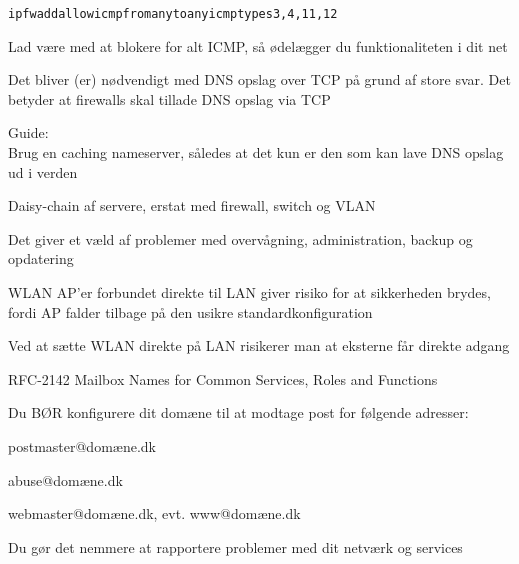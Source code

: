 \documentclass[Screen16to9,17pt]{foils}
\begin{document}

\begin{alltt}
ipfw add allow icmp from any to any icmptypes 3,4,11,12
\end{alltt}

\begin{list1}
\item Lad være med at blokere for alt ICMP, så ødelægger du funktionaliteten i dit net
\vskip 1cm
\item \end{list1}


\begin{list1}
\item Det bliver (er) nødvendigt med DNS opslag over TCP på grund af store svar. Det betyder at firewalls skal tillade DNS opslag via TCP
\vskip 1cm
\item
\item Guide:\\
Brug en caching nameserver, således at det kun er den som kan lave DNS opslag ud i verden

\end{list1}



\begin{list1}
\item Daisy-chain af servere, erstat med firewall, switch og VLAN
\item Det giver et væld af problemer med overvågning, administration, backup og opdatering
\end{list1}



\begin{list1}
\item WLAN AP'er forbundet direkte til LAN giver risiko for at sikkerheden brydes, fordi AP falder tilbage på den usikre standardkonfiguration
\item Ved at sætte WLAN direkte på LAN risikerer man at eksterne får direkte adgang
\end{list1}



\begin{list1}
\item RFC-2142 Mailbox Names for Common Services, Roles and Functions
\item Du BØR konfigurere dit domæne til at modtage post for følgende adresser:
\begin{list2}
\item postmaster@domæne.dk
\item abuse@domæne.dk
\item webmaster@domæne.dk, evt. www@domæne.dk
\end{list2}
\item Du gør det nemmere at rapportere problemer med dit netværk og services
\end{list1}
\end{document}
